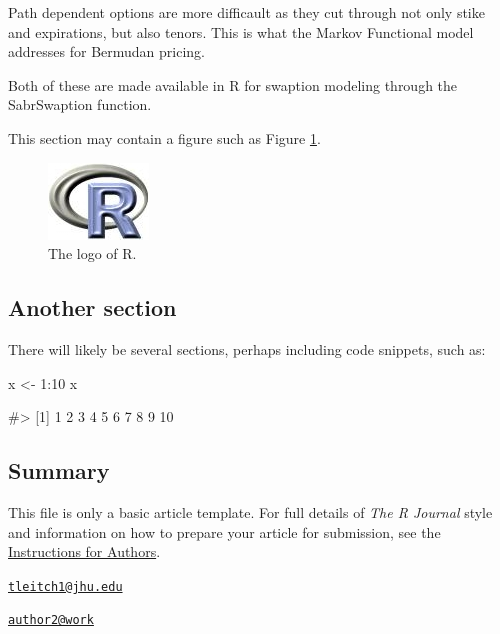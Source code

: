 Path dependent options are more difficault as they cut through not only
stike and expirations, but also tenors. This is what the Markov
Functional model addresses for Bermudan pricing.

Both of these are made available in R for swaption modeling through the
SabrSwaption function.

This section may contain a figure such as Figure \ref{figure:rlogo}.

\begin{figure}[htbp]
  \centering
  \includegraphics{Rlogo}
  \caption{The logo of R.}
  \label{figure:rlogo}
\end{figure}

\subsection{Another section}\label{another-section}

There will likely be several sections, perhaps including code snippets,
such as:

\begin{Schunk}
\begin{Sinput}
x <- 1:10
x
\end{Sinput}
\begin{Soutput}
#>  [1]  1  2  3  4  5  6  7  8  9 10
\end{Soutput}
\end{Schunk}

\subsection{Summary}\label{summary}

This file is only a basic article template. For full details of
\emph{The R Journal} style and information on how to prepare your
article for submission, see the
\href{https://journal.r-project.org/share/author-guide.pdf}{Instructions
for Authors}. 

\address{%
Terry Leitch\\
Ruxton Advisors\\
line 1\\ line 2\\
}
\href{mailto:tleitch1@jhu.edu}{\nolinkurl{tleitch1@jhu.edu}}

\address{%
Author Two\\
Affiliation\\
line 1\\ line 2\\
}
\href{mailto:author2@work}{\nolinkurl{author2@work}}

